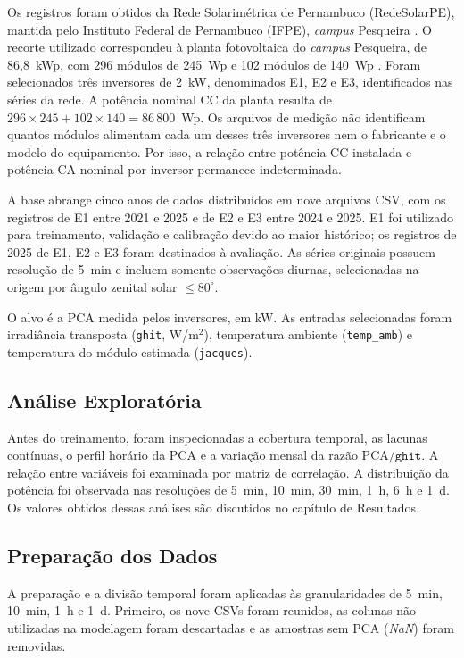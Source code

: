Os registros foram obtidos da Rede Solarimétrica de Pernambuco
(RedeSolarPE), mantida pelo Instituto Federal de Pernambuco (IFPE),
\textit{campus} Pesqueira \cite{pedrosafilho2022,pedrosafilho2025}. O
recorte utilizado correspondeu à planta fotovoltaica do \textit{campus}
Pesqueira, de 86,8~kWp, com 296 módulos de 245~Wp e 102 módulos de 140~Wp
\cite{moraesneto2024}. Foram selecionados três inversores de 2~kW,
denominados E1, E2 e E3, identificados nas séries da rede. A potência
nominal CC da planta resulta de $296\times245+102\times140=86\,800$~Wp. Os
arquivos de medição não identificam quantos módulos alimentam cada um desses
três inversores nem o fabricante e o modelo do equipamento. Por isso, a
relação entre potência CC instalada e potência CA nominal por inversor
permanece indeterminada.

A base abrange cinco anos de dados distribuídos em nove arquivos CSV, com os
registros de E1 entre 2021 e 2025 e de E2 e E3 entre 2024 e 2025. E1 foi
utilizado para treinamento, validação e calibração devido ao maior
histórico; os registros de 2025 de E1, E2 e E3 foram destinados à avaliação.
As séries originais possuem resolução de 5~min e incluem somente observações
diurnas, selecionadas na origem por ângulo zenital solar $\leq 80^\circ$.

O alvo é a PCA medida pelos inversores, em kW. As entradas selecionadas
foram irradiância transposta (\texttt{ghit}, W/m$^2$), temperatura ambiente
(\texttt{temp\_amb}) e temperatura do módulo estimada (\texttt{jacques}).

\subsection{Análise Exploratória}

Antes do treinamento, foram inspecionadas a cobertura temporal, as lacunas
contínuas, o perfil horário da PCA e a variação mensal da razão
$\mathrm{PCA}/\texttt{ghit}$. A relação entre variáveis foi examinada por
matriz de correlação. A distribuição da potência foi observada nas
resoluções de 5~min, 10~min, 30~min, 1~h, 6~h e 1~d. Os valores obtidos
dessas análises são discutidos no capítulo de Resultados.

\subsection{Preparação dos Dados}

A preparação e a divisão temporal foram aplicadas às granularidades de
5~min, 10~min, 1~h e 1~d. Primeiro, os nove CSVs foram reunidos, as colunas
não utilizadas na modelagem foram descartadas e as amostras sem PCA
(\textit{NaN}) foram removidas.

